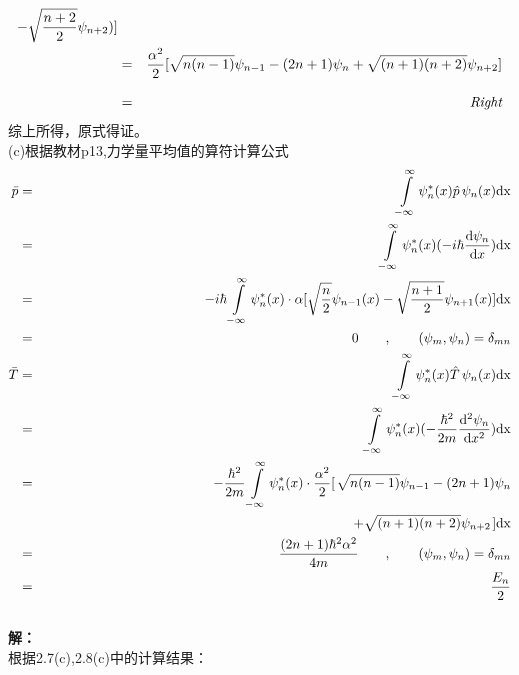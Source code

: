 \documentclass[a4paper]{article}
\begin{document}
\begin{CJK*}{UTF8}{song}
{\begin{eqnarray}
                        - \sqrt{\frac{n + 2}{2}}\psi_{n+2})]\nonumber\\
                    & = & \frac{\alpha^{2}}{2}[\sqrt{n(n-1)}\psi_{n-1} - (2n+1)\psi_{n}
                        + \sqrt{(n+1)(n+2)}\psi_{n+2}]\nonumber\\[8pt]
                    & = & \emph{Right}\nonumber
    \end{eqnarray}
    综上所得，原式得证。\\[12pt]
    (c)根据教材p13,力学量平均值的算符计算公式
    \begin{eqnarray}
        \bar{p} & = & \intop_{-\infty}^{\infty}
                        \psi_{n}^{*}(x)\hat{p}\,\psi_{n}(x)\mathrm{d x}\nonumber\\
            & = & \intop_{-\infty}^{\infty}\psi_{n}^{*}(x)
                        (- i\hbar\frac{\mathrm{d}\psi_{n}}{\mathrm{d} x})\mathrm{d x}\nonumber\\
            & = & - i\hbar\intop_{-\infty}^{\infty}\psi_{n}^{*}(x)
                        \cdot{\alpha}[\sqrt{\frac{n}{2}}\psi_{n-1}(x)
                        - \sqrt{\frac{n + 1}{2}}\psi_{n+1}(x)]\mathrm{d x}\nonumber\\
            & = & 0 \qquad,\qquad (\psi_{m},\psi_{n})=\delta_{m n}\nonumber\\
        \bar{T}   & = & \intop_{-\infty}^{\infty}
                        \psi_{n}^{*}(x)\hat{T}\,\psi_{n}(x)\mathrm{d x}\nonumber\\
            & = & \intop_{-\infty}^{\infty}\psi_{n}^{*}(x)
                        (- \frac{\hbar^{2}}{2 m}\frac{\mathrm{d^{2}}\psi_{n}}{\mathrm{d} x^{2}})\mathrm{d x}\nonumber\\
            & = & - \frac{\hbar^{2}}{2 m}\intop_{-\infty}^{\infty}\psi_{n}^{*}(x)
                \cdot\frac{\alpha^{2}}{2}\mbox{$\left[\right.$}\sqrt{n(n-1)}\psi_{n-1} - (2n+1)\psi_{n}\nonumber\\
            &   & \rightline{\mbox{$+ \sqrt{(n+1)(n+2)}\psi_{n+2}{\left.\right]}\mathrm{d x}$}}\nonumber\\
            & = & \frac{(2 n + 1 )\hbar^{2}\alpha^{2}}{4m}
                \qquad,\qquad (\psi_{m},\psi_{n})=\delta_{m n}\nonumber\\
            & = & \frac{E_{n}}{2}\nonumber
    \end{eqnarray}
    }\\[20pt]
     \textbf{解：}\\[12pt]
    {
    根据2.7(c),2.8(c)中的计算结果：\\
}
\end{CJK*}
\end{document}
